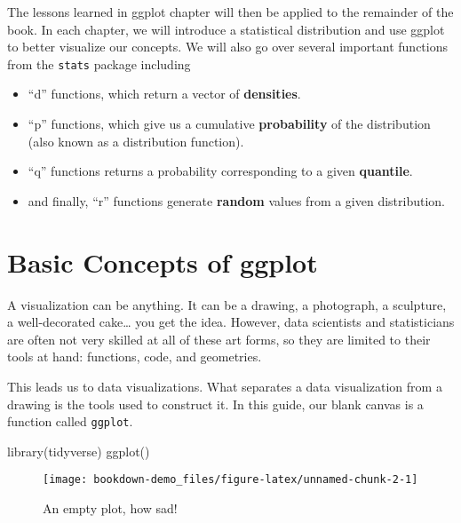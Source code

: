 \documentclass[
]{book}
\newenvironment{Shaded}{\begin{snugshade}}{\end{snugshade}}
\newcommand{\FunctionTok}[1]{\textcolor[rgb]{0.00,0.00,0.00}{#1}}
\newcommand{\NormalTok}[1]{#1}
\begin{document}
The lessons learned in ggplot chapter will then be applied to the remainder of the book. In each chapter, we will introduce a statistical distribution and use ggplot to better visualize our concepts. We will also go over several important functions from the \texttt{stats} package including

\begin{itemize}
\item
  ``d'' functions, which return a vector of \textbf{densities}.
\item
  ``p'' functions, which give us a cumulative \textbf{probability} of the distribution (also known as a distribution function).
\item
  ``q'' functions returns a probability corresponding to a given \textbf{quantile}.
\item
  and finally, ``r'' functions generate \textbf{random} values from a given distribution.
\end{itemize}

\hypertarget{ggplot}{%
\chapter{Basic Concepts of ggplot}\label{ggplot}}

A visualization can be anything. It can be a drawing, a photograph, a sculpture, a well-decorated cake\ldots{} you get the idea. However, data scientists and statisticians are often not very skilled at all of these art forms, so they are limited to their tools at hand: functions, code, and geometries.

This leads us to data visualizations. What separates a data visualization from a drawing is the tools used to construct it. In this guide, our blank canvas is a function called \texttt{ggplot}.

\begin{Shaded}
\begin{Highlighting}[]
\FunctionTok{library}\NormalTok{(tidyverse)}
\FunctionTok{ggplot}\NormalTok{()}
\end{Highlighting}
\end{Shaded}

\begin{figure}

{\centering \texttt{[image: bookdown-demo\_files/figure-latex/unnamed-chunk-2-1]} 

}

\caption{An empty plot, how sad!}\label{fig:unnamed-chunk-2}
\end{figure}
\end{document}
